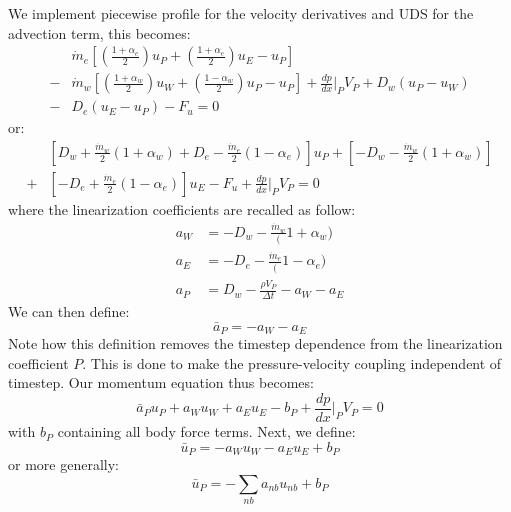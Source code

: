\documentclass[11pt]{article}
\begin{document}
We implement piecewise profile for the velocity derivatives and UDS for the advection term, this becomes:
\begin{equation*}
\begin{aligned}
&\dot{m}_e\left[\left(\frac{1+\alpha_e}{2}\right)u_P +  \left(\frac{1+\alpha_e}{2}\right)u_E - u_P \right]\\
-&\dot{m}_w \left[\left(\frac{1+\alpha_w}{2}\right)u_W  + \left(\frac{1-\alpha_w}{2}\right)u_P - u_P \right] + \frac{dp}{dx}\biggr \rvert_P V_P
+ D_w (u_P-u_W)\\
-&D_e(u_E-u_P)-F_u = 0
\end{aligned}
\end{equation*}
or:
\begin{equation*}
\begin{aligned}
&\left[D_w + \frac{\dot{m}_w}{2}(1+\alpha_w) + D_e - \frac{\dot{m}_e}{2}(1-\alpha_e)   \right]u_P + \left[-D_w - \frac{\dot{m}_w}{2}(1 + \alpha_w)   \right]\\
+ &\left[-D_e + \frac{\dot{m}_e}{2}(1-\alpha_e) \right]u_E - F_u + \frac{dp}{dx} \biggr \rvert_P V_P = 0
\end{aligned}
\end{equation*}
where the linearization coefficients are recalled as follow:
\begin{equation*}
\begin{aligned}
a_W &= -D_w - \frac{\dot{m}_w}(1+\alpha_w)\\
a_E &= -D_e - \frac{\dot{m}_e}(1-\alpha_e)\\
a_P &= D_w - \frac{\rho V_P}{\Delta t} - a_W - a_E
\end{aligned}
\end{equation*}
We can then define:
\begin{equation*}
\boxed{\bar{a}_P = -a_W - a_E}
\end{equation*}
Note how this definition removes the timestep dependence from the linearization coefficient \(P\).
This is done to make the pressure-velocity coupling independent of timestep. Our momentum equation thus
becomes:
\begin{equation*}
\bar{a}_Pu_P + a_Wu_W + a_Eu_E - b_P + \frac{dp}{dx}\biggr\rvert_P V_P = 0
\end{equation*}
with \(b_P\) containing all body force terms. Next, we define:
\begin{equation*}
\boxed{\bar{u}_P = -a_Wu_W - a_Eu_E + b_P}
\end{equation*}
or more generally:
\begin{equation*}
\bar{u}_P = - \sum_{nb} a_{nb}u_{nb} + b_P
\end{equation*}
\end{document}
